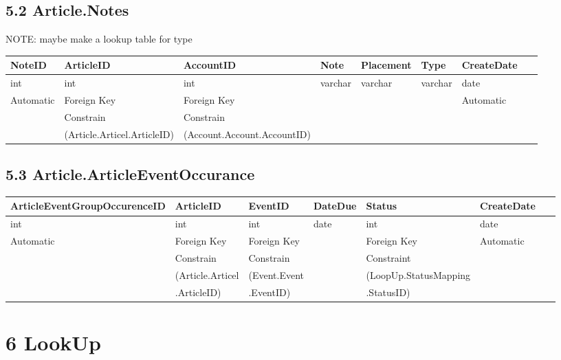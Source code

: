 \documentclass[12pt,fleqn]{article}
\begin{document}
\subsection*{5.2 Article.Notes }
\par NOTE: maybe make a lookup table for type
\begin{table}[htbp]
\centering
\footnotesize
\label{DB changes}
    \begin{tabular}{|l|l|l|l|l|l|l|l|} 
        \hline
        NoteID & ArticleID & AccountID & Note & Placement & Type &  CreateDate & ~\\ \hline
        int & int & int & varchar & varchar & varchar & date & ~\\ \hline
        Automatic & Foreign Key & Foreign Key & ~  & ~  & ~  &  Automatic & ~ \\
        ~ &  Constrain &  Constrain & ~  & ~  & ~  &  ~ & ~  \\  
        ~ &  (Article.Articel.ArticleID) & (Account.Account.AccountID) & ~  & ~ & ~ & ~ \\ 
        \hline  
    \end{tabular}
\end{table}
\FloatBarrier
\subsection*{5.3 Article.ArticleEventOccurance }
\begin{table}[htbp]
\centering
\footnotesize
\label{DB changes}
    \begin{tabular}{|l|l|l|l|l|l|l|} 
        \hline
        ArticleEventGroupOccurenceID &ArticleID & EventID & DateDue & Status & CreateDate & ~\\ \hline
        int & int & int & date & int &  date & ~\\ \hline
        Automatic & Foreign Key & Foreign Key & ~  & Foreign Key  &   Automatic & ~ \\
        ~ &  Constrain &  Constrain & ~  & Constraint  & ~  &  ~  \\  
        ~ &  (Article.Articel & (Event.Event & ~  & (LoopUp.StatusMapping & ~ & ~ \\ 
        ~ &  .ArticleID) & .EventID) &  ~ & .StatusID) & ~ & ~ \\ 
        \hline  
    \end{tabular}
\end{table}
\FloatBarrier
\newpage
\section* {6 LookUp}
\end{document}
